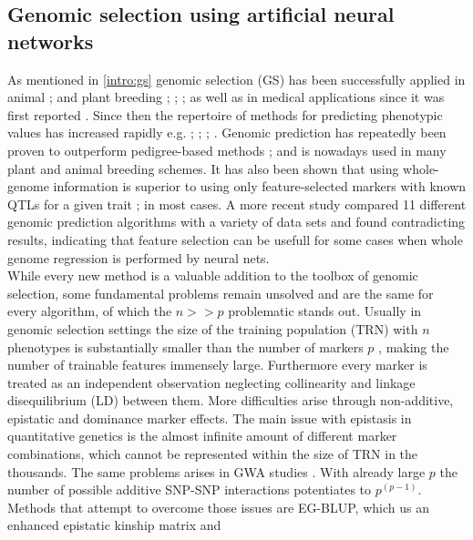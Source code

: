 \subsection{Genomic selection using artificial neural networks }

As mentioned in \ref{intro:gs} genomic selection (GS) has been successfully applied in
animal \cite{hayes2010genome}; \cite{gianola2015one} and plant breeding \cite{crossa2010};
\cite{heffner2010plant}; \cite{desta2014genomic}; \cite{crossa2017} as well as in medical
applications since it was first reported \cite{hayes2001}. Since then the repertoire of
methods for predicting phenotypic values has increased rapidly e.g. \cite{dlc2009};
\cite{habier2011}; \cite{gianola2013}; \cite{crossa2017}. Genomic prediction has
repeatedly been proven to outperform pedigree-based methods \cite{crossa2010};
\cite{albrecht2011} and is nowadays used in many plant and animal breeding schemes. It has
also been shown that using whole-genome information is superior to using only
feature-selected markers with known QTLs for a given trait \cite{bernardo2007};
\cite{heffner2011} in most cases. A more recent study \cite{azodi2019} compared 11
different genomic prediction algorithms with a variety of data sets and found
contradicting results, indicating that feature selection can be usefull for some cases
when whole genome regression is performed by neural nets. \\
While every new method is a valuable addition to the toolbox of genomic selection, some
fundamental problems remain unsolved and are the same for every algorithm, of which the
$n>>p$ problematic stands out. Usually in genomic selection settings the size of the
training population (TRN) with $n$ phenotypes is substantially smaller than the number of
markers $p$ \cite{fan2014challenges}, making the number of trainable features immensely
large. Furthermore every marker is treated as an independent observation neglecting
collinearity and linkage disequilibrium (LD) between them. More difficulties arise through
non-additive, epistatic and dominance marker effects. The main issue with epistasis in
quantitative genetics is the almost infinite amount of different marker combinations,
which cannot be represented within the size of TRN in the thousands. The same problems
arises in GWA studies \cite{korte2013advantages}. With already large $p$ the number of
possible additive SNP-SNP interactions potentiates to $p^{(p-1)}$. Methods that attempt to
overcome those issues are EG-BLUP, which us an enhanced epistatic kinship matrix and
